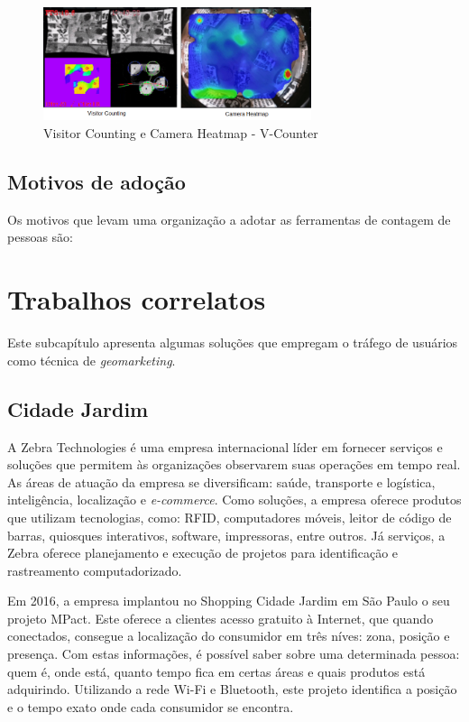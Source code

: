 \begin{figure}[htb]
  \caption{\label{v-count2}Visitor Counting e Camera Heatmap - V-Counter}
  \begin{center}
    \includegraphics[width=0.70\textwidth]{img/termal-vcount.png}
  \end{center}
\end{figure}

\subsection{Motivos de adoção}
Os motivos que levam uma organização a adotar as ferramentas de contagem de pessoas são:

\section{Trabalhos correlatos}
Este subcapítulo apresenta algumas soluções que
empregam o tráfego de usuários como técnica de \emph{geomarketing}.

\subsection{Cidade Jardim}
A Zebra Technologies é uma empresa internacional
líder em fornecer serviços e soluções que permitem às organizações observarem
suas operações em tempo real. As áreas de atuação da empresa se diversificam:
saúde, transporte e logística, inteligência, localização e \emph{e-commerce}.
Como soluções, a empresa oferece produtos que utilizam tecnologias, como: RFID,
computadores móveis, leitor de código de barras, quiosques interativos,
software, impressoras, entre outros. Já serviços, a Zebra oferece planejamento e
execução de projetos para identificação e rastreamento computadorizado.

Em 2016, a empresa implantou no Shopping Cidade Jardim em São Paulo o seu
projeto MPact. Este oferece a clientes acesso gratuito à Internet, que quando
conectados, consegue a localização do consumidor em três níves: zona, posição e
presença. Com estas informações, é possível saber sobre uma determinada pessoa:
quem é, onde está, quanto tempo fica em certas áreas e quais produtos está
adquirindo. Utilizando a rede Wi-Fi e Bluetooth, este projeto identifica a
posição e o tempo exato onde cada consumidor se encontra.

